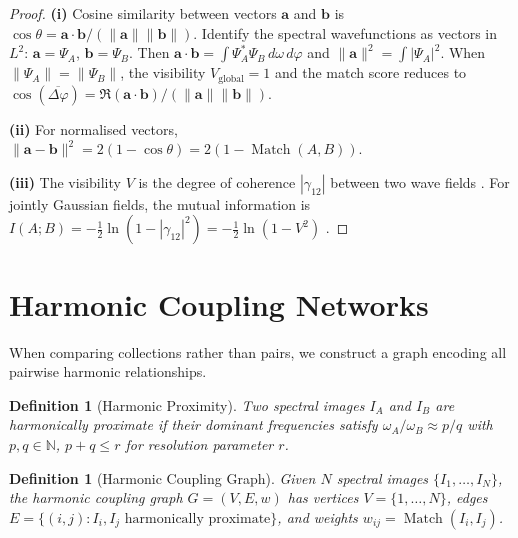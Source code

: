 \documentclass[11pt,twocolumn,a4paper]{article}
\newtheorem{definition}[theorem]{Definition}
\newcommand{\N}{\mathbb{N}}
\DeclareMathOperator{\Match}{Match}
\begin{document}
\begin{proof}
\textbf{(i)} Cosine similarity between vectors $\mathbf{a}$ and
$\mathbf{b}$ is $\cos\theta = \mathbf{a} \cdot \mathbf{b} /
(\|\mathbf{a}\| \|\mathbf{b}\|)$. Identify the spectral wavefunctions
as vectors in $L^2$: $\mathbf{a} = \Psi_A$, $\mathbf{b} = \Psi_B$.
Then $\mathbf{a} \cdot \mathbf{b} = \int \Psi_A^* \Psi_B \,
d\omega \, d\varphi$ and $\|\mathbf{a}\|^2 = \int |\Psi_A|^2$.
When $\|\Psi_A\| = \|\Psi_B\|$, the visibility $V_{\text{global}} = 1$
and the match score reduces to $\cos(\overline{\Delta\varphi}) =
\Re(\mathbf{a} \cdot \mathbf{b})/(\|\mathbf{a}\|\|\mathbf{b}\|)$.

\textbf{(ii)} For normalised vectors, $\|\mathbf{a} - \mathbf{b}\|^2 =
2(1 - \cos\theta) = 2(1 - \Match(A, B))$.

\textbf{(iii)} The visibility $V$ is the degree of coherence
$|\gamma_{12}|$ between two wave fields \citep{born1999, vanzernike1938,
glauber1963}. For jointly Gaussian fields, the mutual information is
$I(A; B) = -\frac{1}{2}\ln(1 - |\gamma_{12}|^2) =
-\frac{1}{2}\ln(1 - V^2)$ \citep{cover2006}.
\end{proof}


\section{Harmonic Coupling Networks}
\label{sec:harmonic_coupling}

When comparing collections rather than pairs, we construct a graph
encoding all pairwise harmonic relationships.

\begin{definition}[Harmonic Proximity]
\label{def:harmonic_proximity}
Two spectral images $I_A$ and $I_B$ are \emph{harmonically proximate}
if their dominant frequencies satisfy $\omega_A / \omega_B \approx p/q$
with $p, q \in \N$, $p + q \leq r$ for resolution parameter $r$.
\end{definition}

\begin{definition}[Harmonic Coupling Graph]
\label{def:harmonic_graph}
Given $N$ spectral images $\{I_1, \ldots, I_N\}$, the harmonic
coupling graph $G = (V, E, w)$ has vertices $V = \{1, \ldots, N\}$,
edges $E = \{(i,j) : I_i, I_j \text{ harmonically proximate}\}$, and
weights $w_{ij} = \Match(I_i, I_j)$.
\end{definition}
\end{document}
